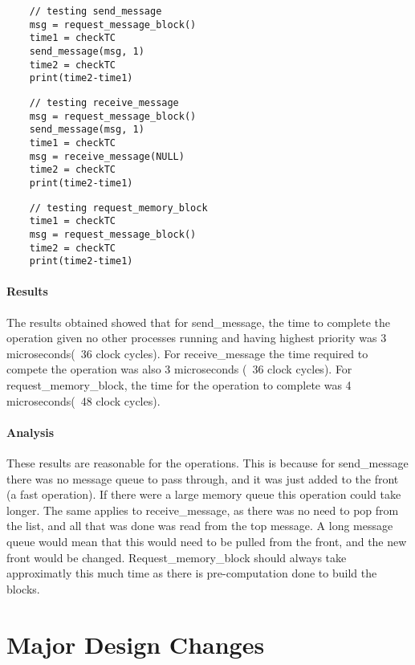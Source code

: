 \documentclass[12pt]{article}
\begin{document}
  \begin{lstlisting}
    // testing send_message
    msg = request_message_block()
    time1 = checkTC
    send_message(msg, 1)
    time2 = checkTC
    print(time2-time1)
  \end{lstlisting}

  \begin{lstlisting}
    // testing receive_message
    msg = request_message_block()
    send_message(msg, 1)
    time1 = checkTC
    msg = receive_message(NULL)
    time2 = checkTC
    print(time2-time1)
  \end{lstlisting}

  \begin{lstlisting}
    // testing request_memory_block
    time1 = checkTC
    msg = request_message_block()
    time2 = checkTC
    print(time2-time1)
  \end{lstlisting}

  \paragraph{Results} The results obtained showed that for send\_message, the time to complete the operation given no other processes running and having highest priority was 3 microseconds(~36 clock cycles). For receive\_message the time required to compete the operation was also 3 microseconds (~36 clock cycles). For request\_memory\_block, the time for the operation to complete was 4 microseconds(~48 clock cycles).

  \paragraph{Analysis} These results are reasonable for the operations. This is because for send\_message there was no message queue to pass through, and it was just added to the front (a fast operation). If there were a large memory queue this operation could take longer. The same applies to receive\_message, as there was no need to pop from the list, and all that was done was read from the top message. A long message queue would mean that this would need to be pulled from the front, and the new front would be changed. Request\_memory\_block should always take approximatly this much time as there is pre-computation done to build the blocks.
\newpage
\section{Major Design Changes}\label{designChanges}
\end{document}
